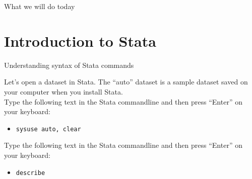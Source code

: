 	
\begin{frame}
	\titlepage
\end{frame}

\begin{frame}{What we will do today}
	\tableofcontents
\end{frame}

\section[Stata]{Introduction to Stata}

\begin{frame}{Understanding syntax of Stata commands}

	Let's open a dataset in Stata. The ``auto'' dataset is a sample dataset saved on your computer when you install Stata. \\
	\vspace{3mm}
	Type the following text in the Stata commandline and then press ``Enter'' on your keyboard: \\
	
	\begin{itemize}
		\item [] \texttt{sysuse auto, clear}
	\end{itemize}	
	
	Type the following text in the Stata commandline and then press ``Enter'' on your keyboard: \\
	
	\begin{itemize}
		\item [] \texttt{describe}
	\end{itemize}	

\end{frame}

